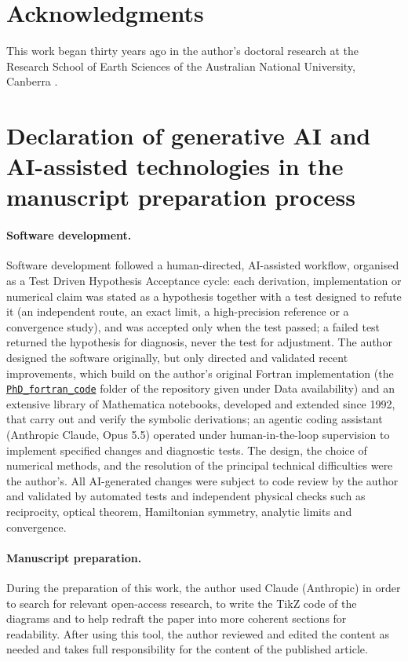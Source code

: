 \documentclass[11pt,a4paper]{article}
\begin{document}
\section*{Acknowledgments}
This work began thirty years ago in the author's doctoral research at the Research School of Earth
Sciences of the Australian National University, Canberra \citep{Nestor1996}.

\section*{Declaration of generative AI and AI-assisted technologies in the manuscript preparation process}
\paragraph{Software development.} Software development followed a human-directed, AI-assisted
workflow, organised as a Test Driven Hypothesis Acceptance cycle: each derivation, implementation or
numerical claim was stated as a hypothesis together with a test designed to refute it (an independent
route, an exact limit, a high-precision reference or a convergence study), and was accepted only when
the test passed; a failed test returned the hypothesis for diagnosis, never the test for adjustment. The author designed the software originally, but only directed and validated recent
improvements, which build on the author's original Fortran implementation (the
\href{https://github.com/tmnestor/MultipleScatteringCalculations/tree/main/PhD_fortran_code}{\texttt{PhD\_fortran\_code}}
folder of the repository given under Data availability) and an extensive library of Mathematica notebooks, developed and extended since 1992, that carry out and verify the symbolic
derivations; an agentic
coding assistant (Anthropic Claude, Opus 5.5) operated under human-in-the-loop supervision to implement
specified changes and diagnostic tests. The design, the choice of numerical methods, and the resolution
of the principal technical difficulties were the author's. All AI-generated changes were subject to code
review by the author and validated by automated tests and independent physical checks such as
reciprocity, optical theorem, Hamiltonian symmetry, analytic limits and convergence.

\paragraph{Manuscript preparation.} During the preparation of this work, the author used Claude
(Anthropic) in order to search for relevant open-access research, to write the TikZ code of the
diagrams and to help redraft the paper into more coherent sections for readability. After using this tool, the author reviewed and edited the content
as needed and takes full responsibility for the content of the published article.



\end{document}
